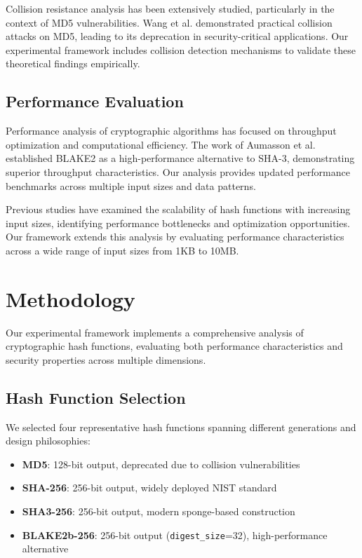\documentclass{article}
\begin{document}
Collision resistance analysis has been extensively studied, particularly in the context of MD5 vulnerabilities. Wang et al. \cite{wang2005finding} demonstrated practical collision attacks on MD5, leading to its deprecation in security-critical applications. Our experimental framework includes collision detection mechanisms to validate these theoretical findings empirically.

\subsection{Performance Evaluation}

Performance analysis of cryptographic algorithms has focused on throughput optimization and computational efficiency. The work of Aumasson et al. \cite{aumasson2013blake2} established BLAKE2 as a high-performance alternative to SHA-3, demonstrating superior throughput characteristics. Our analysis provides updated performance benchmarks across multiple input sizes and data patterns.

Previous studies have examined the scalability of hash functions with increasing input sizes, identifying performance bottlenecks and optimization opportunities. Our framework extends this analysis by evaluating performance characteristics across a wide range of input sizes from 1KB to 10MB.

\section{Methodology}

Our experimental framework implements a comprehensive analysis of cryptographic hash functions, evaluating both performance characteristics and security properties across multiple dimensions.

\subsection{Hash Function Selection}

We selected four representative hash functions spanning different generations and design philosophies:

\begin{itemize}
\item \textbf{MD5}: 128-bit output, deprecated due to collision vulnerabilities \cite{rivest1992md5}
\item \textbf{SHA-256}: 256-bit output, widely deployed NIST standard \cite{nist2002sha}
\item \textbf{SHA3-256}: 256-bit output, modern sponge-based construction \cite{nist2015sha3,bertoni2013keccak}
\item \textbf{BLAKE2b-256}: 256-bit output (\texttt{digest\_size}=32), high-performance alternative \cite{aumasson2013blake2}
\end{itemize}
\end{document}
